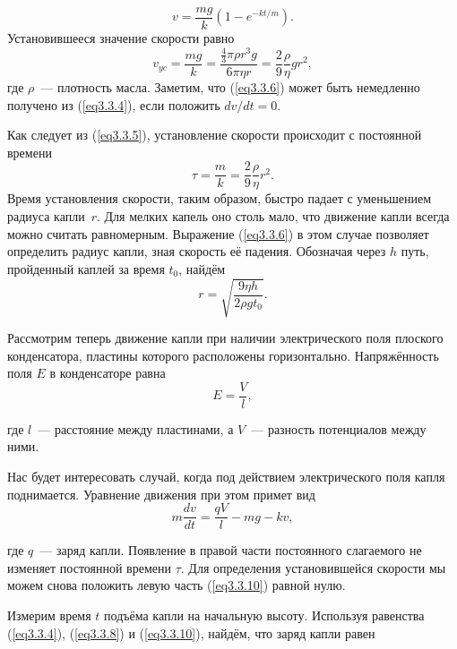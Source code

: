 \begin{equation}
v=\frac{mg }{k}\left(1-e^{-kt/m}\right).
\label{eq3.3.5}
\end{equation}
Установившееся значение скорости равно
\begin{equation}
v_{yc}=\frac{mg }{k}=\frac{\frac 43 \pi\rho r^3g }{6\pi\eta r}=\frac29\frac{\rho}{\eta}g r^2,
\label{eq3.3.6}
\end{equation}
где $\rho$~--- плотность масла. Заметим, что (\ref{eq3.3.6}) может быть немедленно получено из (\ref{eq3.3.4}), если положить $dv/dt=0$.

Как следует из (\ref{eq3.3.5}), установление скорости происходит с постоянной времени
\begin{equation}
\tau=\frac{m}{k}=\frac 29 \frac{\rho}{\eta}r^2.
\label{eq3.3.7}
\end{equation}
Время установления скорости, таким образом, быстро падает с уменьшением радиуса капли~$r$. Для мелких капель оно столь мало, что движение капли всегда можно считать равномерным. Выражение (\ref{eq3.3.6}) в этом случае позволяет определить радиус капли, зная скорость её падения. Обозначая через $h$ путь, пройденный каплей за время $t_0$, найдём
\begin{equation}
r=\sqrt{\frac{9\eta h}{2\rho g t_0}}.
\label{eq3.3.8}
\end{equation}

Рассмотрим теперь движение капли при наличии электрического поля плоского конденсатора, пластины которого расположены горизонтально. Напряжённость поля $E$ в конденсаторе равна
\begin{equation}
E=\frac{V}{l},
\label{eq3.3.9}
\end{equation}

где $l$~--- расстояние между пластинами, а $V$~--- разность потенциалов между ними.

Нас будет интересовать случай, когда под действием электрического поля капля поднимается. Уравнение движения при этом примет вид
\begin{equation}
m\frac{dv}{dt}=\frac{qV}{l}-mg -kv,
\label{eq3.3.10}
\end{equation}

где $q$~--- заряд капли. Появление в правой части постоянного слагаемого не изменяет постоянной времени $\tau$. Для
определения установившейся скорости мы можем снова положить левую часть (\ref{eq3.3.10}) равной нулю.

Измерим время $t$ подъёма капли на начальную высоту. Используя равенства (\ref{eq3.3.4}), (\ref{eq3.3.8}) и (\ref{eq3.3.10}), найдём, что заряд капли равен

